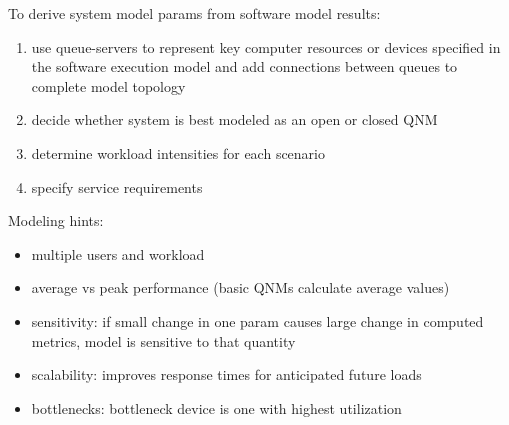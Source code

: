\documentclass[11pt]{article}
\begin{document}
To derive system model params from software model results:
\begin{enumerate}
\item use queue-servers to represent key computer resources or devices specified in
the software execution model and add connections between queues to complete model
topology
\item decide whether system is best modeled as an open or closed QNM
\item determine workload intensities for each scenario
\item specify service requirements
\end{enumerate}

Modeling hints:
\begin{itemize}
\item multiple users and workload
\item average vs peak performance (basic QNMs calculate average values)
\item sensitivity: if small change in one param causes large change in
computed metrics, model is sensitive to that quantity
\item scalability: improves response times for anticipated future loads
\item bottlenecks: bottleneck device is one with highest utilization
\end{itemize}
\end{document}

